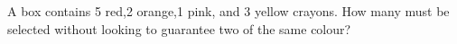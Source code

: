 A box contains 5 red,2 orange,1 pink, and 3 yellow crayons. How many must be selected without looking to guarantee two of the same colour?
